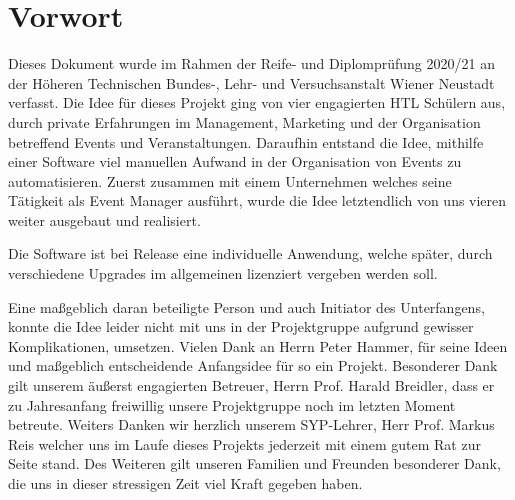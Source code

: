 \chapter{Vorwort}
Dieses Dokument wurde im Rahmen der Reife- und Diplomprüfung 2020/21 an der Höheren Technischen Bundes-, Lehr- und Versuchsanstalt Wiener Neustadt verfasst. Die Idee für dieses Projekt ging von vier engagierten HTL Schülern aus, durch
private Erfahrungen im Management, Marketing und der Organisation betreffend Events und Veranstaltungen. Daraufhin entstand die Idee, mithilfe einer Software viel manuellen Aufwand in der Organisation von Events zu automatisieren. Zuerst zusammen mit einem Unternehmen
welches seine Tätigkeit als Event Manager ausführt, wurde die Idee letztendlich von uns vieren weiter ausgebaut und realisiert.

Die Software ist bei Release eine individuelle Anwendung, welche später, durch verschiedene Upgrades im allgemeinen lizenziert vergeben werden soll.\newline

Eine maßgeblich daran beteiligte Person und auch Initiator des Unterfangens, konnte die Idee leider nicht mit uns in der Projektgruppe aufgrund gewisser Komplikationen, umsetzen.\newline
Vielen Dank an Herrn Peter Hammer, für seine Ideen und maßgeblich entscheidende Anfangsidee für so ein Projekt.
Besonderer Dank gilt unserem äußerst engagierten Betreuer, Herrn Prof. Harald Breidler, dass er zu Jahresanfang freiwillig unsere Projektgruppe noch im letzten Moment betreute. Weiters Danken wir herzlich unserem SYP-Lehrer, Herr Prof. Markus Reis
welcher uns im Laufe dieses Projekts jederzeit mit einem gutem Rat zur Seite stand. 
Des Weiteren gilt unseren Familien und Freunden besonderer Dank, die uns in dieser stressigen Zeit viel Kraft gegeben haben.